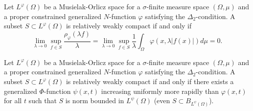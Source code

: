 \documentclass[10pt,a4paper]{amsart}
\newcommand{\lphi}{{L^{\varphi}(\Omega)}}
\begin{document}
\begin{teorema}\label{crit2}
Let $\lphi$ be a Musielak-Orlicz space for a $\sigma$-finite measure space $(\Omega,\mu)$ and a proper constrained generalized $N$-function $\varphi$ satisfying the $\Delta_2$-condition. A subset $S\subset \lphi$ is relatively weakly compact if and only if
\begin{equation}\label{condicion}
\lim_{\lambda\rightarrow 0} \sup_{f\in S} \frac{\rho_{\varphi}(\lambda f)}{\lambda}
=\lim_{\lambda\rightarrow 0} \sup_{f\in S} \frac{1}{\lambda}\int_{\Omega} \varphi(x,\lambda \vert f(x)\vert) d\mu=0.
\end{equation}
\end{teorema}

\begin{teorema}\label{Th.M-O}
Let $\lphi$ be a Musielak-Orlicz space for a $\sigma$-finite measure space $(\Omega,\mu)$ and a proper constrained generalized $N$-function $\varphi$ satisfying the $\Delta_2$-condition. A subset $S\subset\lphi$ is relatively weakly compact if and only if there exists a generalized $\Phi$-function $\psi(x,t)$ increasing uniformly more rapidly than $\varphi(x,t)$ for all $t$ such that $S$ is norm bounded in $L^{\psi}(\Omega)$ (even $S\subset B_{L^{\psi}(\Omega)}$).
\end{teorema}
\end{document}
